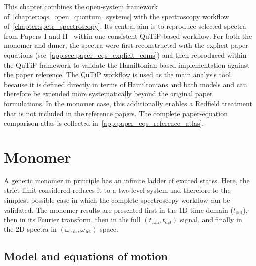 This chapter combines the open-system framework of~\autoref{chapter:oqs_open_quantum_systems} with the spectroscopy workflow of~\autoref{chapter:spctr_spectroscopy}. Its central aim is to reproduce selected spectra from Papers~I and II~\cite{mancaletal2006twodimensionalopticalthreepulse,pisliakovetal2006twodimensionalopticalthreepulse} within one consistent QuTiP-based workflow. For both the monomer and dimer, the spectra were first reconstructed with the explicit paper equations (see~\autoref{app:sec:paper_eqs_explicit_eoms}) and then reproduced within the QuTiP framework to validate the Hamiltonian-based implementation against the paper reference. The QuTiP workflow is used as the main analysis tool, because it is defined directly in terms of Hamiltonians and bath models and can therefore be extended more systematically beyond the original paper formulations. In the monomer case, this additionally enables a Redfield treatment that is not included in the reference papers. The complete paper-equation comparison atlas is collected in~\autoref{app:paper_eqs_reference_atlas}.

\section{Monomer}
\label{sec:results_monomer}

A generic monomer in principle has an infinite ladder of excited states. Here, the strict limit considered reduces it to a two-level system and therefore to the simplest possible case in which the complete spectroscopy workflow can be validated. The monomer results are presented first in the 1D time domain ($t_{\mathrm{det}}$), then in its Fourier transform, then in the full $(t_{\mathrm{coh}},t_{\mathrm{det}})$ signal, and finally in the 2D spectra in $(\omega_{\mathrm{coh}},\omega_{\mathrm{det}})$ space.

\subsection{Model and equations of motion}
\label{subsec:results_monomer_model_eom}


